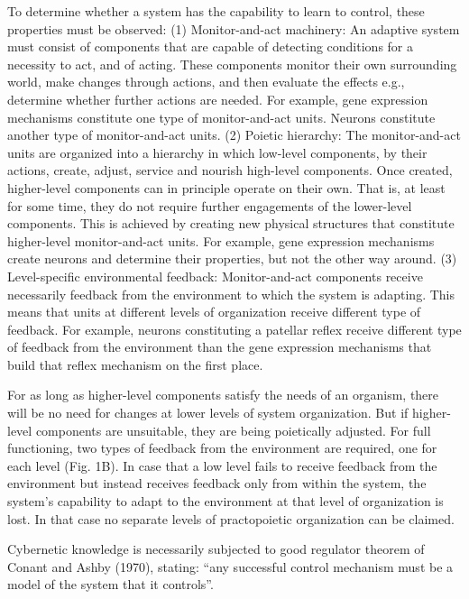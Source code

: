 \documentclass[10pt,a4paper]{article}
\begin{document}
To determine whether a system has the capability to learn to
control, these properties must be observed:
(1) Monitor-and-act machinery: An adaptive system must consist of
components that are capable of detecting conditions for a
necessity to act, and of acting. These components monitor their
own surrounding world, make changes through actions, and
then evaluate the effects e.g., determine whether further
actions are needed. For example, gene expression mechanisms
constitute one type of monitor-and-act units. Neurons constitute
another type of monitor-and-act units.
(2) Poietic hierarchy: The monitor-and-act units are organized into
a hierarchy in which low-level components, by their actions,
create, adjust, service and nourish high-level components.
Once created, higher-level components can in principle operate
on their own. That is, at least for some time, they do not
require further engagements of the lower-level components.
This is achieved by creating new physical structures that
constitute higher-level monitor-and-act units. For example,
gene expression mechanisms create neurons and determine
their properties, but not the other way around.
(3) Level-specific environmental feedback: Monitor-and-act components
receive necessarily feedback from the environment to
which the system is adapting. This means that units at
different levels of organization receive different type of feedback.
For example, neurons constituting a patellar reflex
receive different type of feedback from the environment than
the gene expression mechanisms that build that reflex mechanism
on the first place.



For as long as higher-level components
satisfy the needs of an organism, there will be no need for
changes at lower levels of system organization. But if higher-level
components are unsuitable, they are being poietically adjusted. For
full functioning, two types of feedback from the environment are
required, one for each level (Fig. 1B). In case that a low level fails to
receive feedback from the environment but instead receives feedback
only from within the system, the system’s capability to adapt
to the environment at that level of organization is lost. In that case
no separate levels of practopoietic organization can be claimed.



Cybernetic knowledge is necessarily subjected to good
regulator theorem of Conant and Ashby (1970), stating: “any successful
control mechanism must be a model of the system that it controls”.
\end{document}
